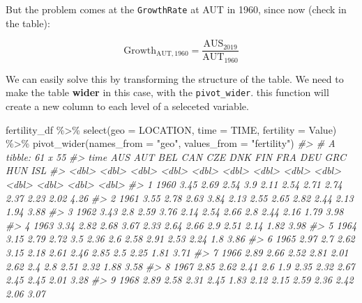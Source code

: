 \documentclass[
]{article}
\newenvironment{Shaded}{\begin{snugshade}}{\end{snugshade}}
\newcommand{\AttributeTok}[1]{\textcolor[rgb]{0.77,0.63,0.00}{#1}}
\newcommand{\CommentTok}[1]{\textcolor[rgb]{0.56,0.35,0.01}{\textit{#1}}}
\newcommand{\FunctionTok}[1]{\textcolor[rgb]{0.00,0.00,0.00}{#1}}
\newcommand{\NormalTok}[1]{#1}
\newcommand{\SpecialCharTok}[1]{\textcolor[rgb]{0.00,0.00,0.00}{#1}}
\newcommand{\StringTok}[1]{\textcolor[rgb]{0.31,0.60,0.02}{#1}}
\begin{document}
But the problem comes at the \texttt{GrowthRate} at AUT in 1960, since now (check in the table):

\[\text{Growth}_{\text{AUT}, 1960} = \frac{\text{AUS}_{2019}}{\text{AUT}_{1960}}\]

We can easily solve this by transforming the structure of the table. We need to make the table \textbf{wider} in this case, with the \texttt{pivot\_wider}. this function will create a new column to each level of a seleceted variable.

\begin{Shaded}
\begin{Highlighting}[]
\NormalTok{fertility\_df }\SpecialCharTok{\%\textgreater{}\%} 
  \FunctionTok{select}\NormalTok{(}\AttributeTok{geo =}\NormalTok{ LOCATION, }\AttributeTok{time =}\NormalTok{ TIME, }\AttributeTok{fertility =}\NormalTok{ Value) }\SpecialCharTok{\%\textgreater{}\%} 
  \FunctionTok{pivot\_wider}\NormalTok{(}\AttributeTok{names\_from =} \StringTok{"geo"}\NormalTok{, }\AttributeTok{values\_from =} \StringTok{"fertility"}\NormalTok{)}
\CommentTok{\#\textgreater{} \# A tibble: 61 x 55}
\CommentTok{\#\textgreater{}     time   AUS   AUT   BEL   CAN   CZE   DNK   FIN   FRA   DEU   GRC   HUN   ISL}
\CommentTok{\#\textgreater{}    \textless{}dbl\textgreater{} \textless{}dbl\textgreater{} \textless{}dbl\textgreater{} \textless{}dbl\textgreater{} \textless{}dbl\textgreater{} \textless{}dbl\textgreater{} \textless{}dbl\textgreater{} \textless{}dbl\textgreater{} \textless{}dbl\textgreater{} \textless{}dbl\textgreater{} \textless{}dbl\textgreater{} \textless{}dbl\textgreater{} \textless{}dbl\textgreater{}}
\CommentTok{\#\textgreater{}  1  1960  3.45  2.69  2.54  3.9   2.11  2.54  2.71  2.74  2.37  2.23  2.02  4.26}
\CommentTok{\#\textgreater{}  2  1961  3.55  2.78  2.63  3.84  2.13  2.55  2.65  2.82  2.44  2.13  1.94  3.88}
\CommentTok{\#\textgreater{}  3  1962  3.43  2.8   2.59  3.76  2.14  2.54  2.66  2.8   2.44  2.16  1.79  3.98}
\CommentTok{\#\textgreater{}  4  1963  3.34  2.82  2.68  3.67  2.33  2.64  2.66  2.9   2.51  2.14  1.82  3.98}
\CommentTok{\#\textgreater{}  5  1964  3.15  2.79  2.72  3.5   2.36  2.6   2.58  2.91  2.53  2.24  1.8   3.86}
\CommentTok{\#\textgreater{}  6  1965  2.97  2.7   2.62  3.15  2.18  2.61  2.46  2.85  2.5   2.25  1.81  3.71}
\CommentTok{\#\textgreater{}  7  1966  2.89  2.66  2.52  2.81  2.01  2.62  2.4   2.8   2.51  2.32  1.88  3.58}
\CommentTok{\#\textgreater{}  8  1967  2.85  2.62  2.41  2.6   1.9   2.35  2.32  2.67  2.45  2.45  2.01  3.28}
\CommentTok{\#\textgreater{}  9  1968  2.89  2.58  2.31  2.45  1.83  2.12  2.15  2.59  2.36  2.42  2.06  3.07}

\end{Highlighting}
\end{Shaded}
\end{document}
